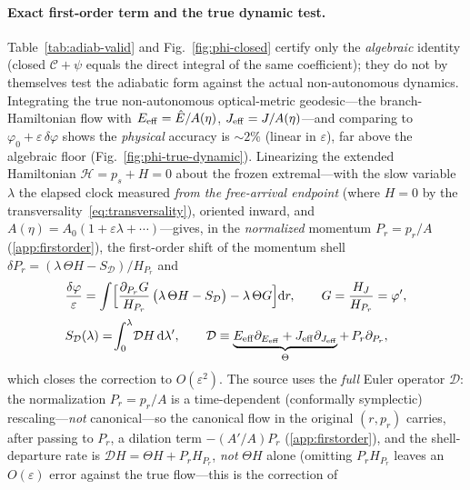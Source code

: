 \documentclass[12pt]{iopart}
\newcommand{\Ehat}{\hat E}
\newcommand{\dd}{\mathrm{d}}
\begin{document}
\paragraph{Exact first-order term and the true dynamic test.} Table~\ref{tab:adiab-valid}
and Fig.~\ref{fig:phi-closed} certify only the \emph{algebraic} identity (closed
$\mathcal{C}+\psi$ equals the direct integral of the same coefficient); they do not by
themselves test the adiabatic form against the actual non-autonomous dynamics. Integrating
the true non-autonomous optical-metric geodesic---the branch-Hamiltonian flow with
$E_{\rm eff}=\Ehat/A(\eta)$, $J_{\rm eff}=J/A(\eta)$---and comparing to
$\varphi_0+\varepsilon\,\delta\varphi$ shows the \emph{physical} accuracy is $\sim2\%$
(linear in $\varepsilon$), far above the algebraic floor
(Fig.~\ref{fig:phi-true-dynamic}). Linearizing the extended Hamiltonian
$\mathcal H=p_s+H=0$ about the frozen extremal---with the slow variable
$\lambda$ the elapsed clock measured \emph{from the free-arrival endpoint} (where
$H=0$ by the transversality~\eqref{eq:transversality}), oriented inward, and
$A(\eta)=A_0(1+\varepsilon\lambda+\cdots)$---gives, in the \emph{normalized} momentum
$P_r=p_r/A$ (\ref{app:firstorder}), the first-order shift of the momentum shell
$\delta P_r=(\lambda\,\Theta H-S_{\mathcal D})/H_{P_r}$ and
\begin{equation}
    \begin{aligned}
    &\frac{\delta\varphi}{\varepsilon}=\int\!\Big[\frac{\partial_{P_r}G}{H_{P_r}}\,
    \big(\lambda\,\Theta H-S_{\mathcal D}\big)-\lambda\,\Theta G\Big]\dd r,\qquad
    G=\frac{H_J}{H_{P_r}}=\varphi',\\[2pt]
    &S_{\mathcal D}(\lambda)=\!\int_0^{\lambda}\!\mathcal D H\,\dd\lambda',\qquad
    \mathcal D\equiv\underbrace{E_{\rm eff}\partial_{E_{\rm eff}}+J_{\rm eff}\partial_{J_{\rm eff}}}_{\Theta}
    +\,P_r\partial_{P_r},
    \end{aligned}
    \label{eq:adiab-exact}
\end{equation}
which closes the correction to $O(\varepsilon^2)$. The source uses the \emph{full} Euler
operator $\mathcal D$: the normalization $P_r=p_r/A$ is a time-dependent (conformally
symplectic) rescaling---\emph{not} canonical---so the canonical flow in the original
$(r,p_r)$ carries, after passing to $P_r$, a dilation term
$-\!\left(A'/A\right)P_r$ (\ref{app:firstorder}), and the shell-departure rate is $\mathcal D H=\Theta
H+P_r H_{P_r}$, \emph{not} $\Theta H$ alone (omitting $P_r H_{P_r}$ leaves an
$O(\varepsilon)$ error against the true flow---this is the correction of
\end{document}
